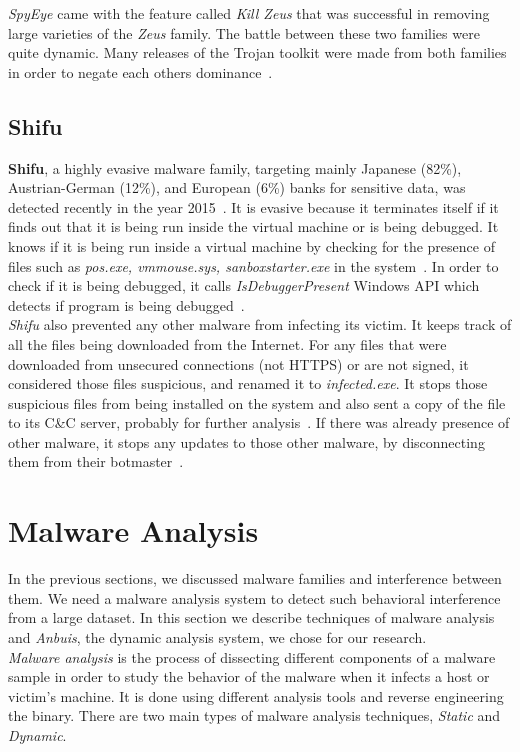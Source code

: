 \textit{SpyEye} came with the feature called \emph{Kill Zeus} that was successful in removing large varieties of the \emph{Zeus} family.
The battle between these two families were quite dynamic.
Many releases of the Trojan toolkit were made from both families in order to negate each others dominance~\cite[]{sanszeus}.
\subsection{Shifu}
\label{sub:Shifu}
\textbf{Shifu}, a highly evasive malware family, targeting mainly Japanese (82\%), Austrian-German (12\%), and European (6\%) banks for sensitive data, was detected recently in the year 2015~\cite[]{secintelshifu}.
It is evasive because it terminates itself if it finds out that it is being run inside the virtual machine or is being debugged.
It knows if it is being run inside a virtual machine by checking for the presence of files such as \emph{pos.exe, vmmouse.sys, sanboxstarter.exe} in the system~\cite[]{mccafeshifu}.
In order to check if it is being debugged, it calls \emph{IsDebuggerPresent} Windows API which detects if program is being debugged~\cite[]{mccafeshifu}.\\
\emph{Shifu} also prevented any other malware from infecting its victim.
It keeps track of all the files being downloaded from the Internet.
For any files that were downloaded from unsecured connections (not HTTPS) or are not signed, it considered those files suspicious, and renamed it to \emph{infected.exe}.
It stops those suspicious files from being installed on the system and also sent a copy of the file to its C\&C server, probably for further analysis~\cite[]{secintelshifu}.
If there was already presence of other malware, it stops any updates to those other malware, by disconnecting them from their botmaster~\cite[]{secintelshifu}.
\section{Malware Analysis}
\label{sec:Malware Analysis}
In the previous sections, we discussed malware families and interference between them.
We need a malware analysis system to detect such behavioral interference from a large dataset.
In this section we describe techniques of malware analysis and \emph{Anbuis}, the dynamic analysis system, we chose for our research.\\

\emph{Malware analysis} is the process of dissecting different components of a malware sample in order to study the behavior of the malware when it infects a host or victim's machine.
It is done using different analysis tools and reverse engineering the binary.
There are two main types of malware analysis techniques, \emph{Static} and \emph{Dynamic}.\\

